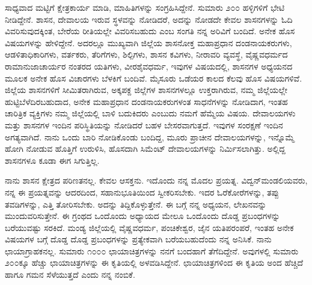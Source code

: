 ಸಾಧ್ಯವಾದ ಮಟ್ಟಿಗೆ ಕ್ಷೇತ್ರಕಾರ್ಯ ಮಾಡಿ, ಮಾಹಿತಿಗಳನ್ನು ಸಂಗ್ರಹಿಸಿದ್ದೇನೆ. ಸುಮಾರು ೨೦೦ ಹಳ್ಳಿಗಳಿಗೆ ಭೇಟಿ ನೀಡಿದ್ದೇನೆ. ಶಾಸನ, ದೇವಾಲಯ ಇರುವ ಸ್ಥಳವನ್ನು ನೋಡಿದರೆ, ಅದನ್ನು ನೋಡದೇ ಕೇವಲ ಶಾಸನಗಳನ್ನು ಓದಿ ವಿವರಿಸುವುದಕ್ಕಿಂತ, ಬೇರೆಯ ರೀತಿಯಲ್ಲೇ ವಿವರಿಸಬಹುದು ಎಂಬ ಸಂಗತಿ ನನ್ನ ಅರಿವಿಗೆ ಬಂದಿದೆ. ಅನೇಕ ಹೊಸ ವಿಷಯಗಳನ್ನು ಹೇಳಿದ್ದೇನೆ. ಅದರಲ್ಲೂ ಮುಖ್ಯವಾಗಿ ಜಿಲ್ಲೆಯ ಶಾಸನೋಕ್ತ ಮಹಾಪ್ರಧಾನ ದಂಡನಾಯಕರುಗಳು, ಆಡಳಿತಾಧಿಕಾರಿಗಳು, ವರ್ತಕರು, ತೆರಿಗೆಗಳು, ಶಿಲ್ಪಿಗಳು, ಶಾಸನ ಕವಿಗಳು, ನೀರಾವರಿ ವ್ಯವಸ್ಥೆ, ವೈಷ್ಣವಧರ್ಮದ ರಾಮಾನುಜಾಚಾರ್ಯರ ನಂತರದ ಯತಿಗಳು, ವೀರಶೈವಧರ್ಮ, ಇವುಗಳ ವಿಷಯದಲ್ಲಿ, ಶಾಸನಗಳ ಅಧ್ಯಯನದ ಮೂಲಕ ಅನೇಕ ಹೊಸ ವಿಚಾರಗಳು ಬೆಳಕಿಗೆ ಬಂದಿವೆ. ಮೈಸೂರು ಒಡೆಯರ ಕಾಲದ ಕೆಲವು ಹೊಸ ವಿಷಯಗಳಿವೆ. ಜಿಲ್ಲೆಯ ಶಾಸನಗಳಿಗೆ ಸೀಮಿತರಾಗಿರುವ, ಅಕ್ಕಪಕ್ದ ಜಿಲ್ಲೆಗಳ ಶಾಸನಗಳಲ್ಲೂ ಉಕ್ತರಾಗಿರುವ, ನಮ್ಮ ಜಿಲ್ಲೆಯಲ್ಲೇ ಹುಟ್ಟಿಬೆಳೆದಿರಬಹುದಾದ, ಅನೇಕ ಮಹಾಪ್ರಧಾನ ದಂಡನಾಯಕರುಗಳಂತ ಸಾಧನೆಗಳನ್ನು ನೋಡಿದಾಗ, ಇಂತಹ ಚಾರಿತ್ರಿಕ ವ್ಯಕ್ತಿಗಳು ನಮ್ಮ ಜಿಲ್ಲೆಯಲ್ಲಿ ಬಾಳಿ ಬದುಕಿದರು ಎಂಬುದು ನಮಗೆ ಹೆಮ್ಮೆಯ ವಿಷಯ. ದೇವಾಲಯಗಳು ಮತ್ತು ಶಾಸನಗಳ ಇಂದಿನ ಪರಿಸ್ಥಿತಿಯನ್ನು ನೋಡಿದರೆ ಬಹಳ ಬೇಸರವಾಗುತ್ತದೆ. ಇವುಗಳ ಸಂರಕ್ಷಣೆ ಇಂದಿನ ಅಗತ್ಯವಾಗಿದೆ. ನಾನು ಒಂದು ಬಾರಿ ನೋಡಿಕೊಂಡು ಬಂದಿದ್ದ, ಮೂರು ಪ್ರಾಚೀನ ದೇವಾಲಯಗಳನ್ನು, ಇನ್ನೊಮ್ಮೆ ಹೋಗಿ ನೋಡುವ ಹೊತ್ತಿಗೆ ಉರುಳಿಸಿ, ಹೊಸದಾಗಿ ಸಿಮೆಂಟ್​ ದೇವಾಲಯಗಳನ್ನು ನಿರ್ಮಿಸಲಾಗಿತ್ತು. ಅಲ್ಲಿದ್ದ ಶಾಸನಗಳೂ ಕೂಡಾ ಈಗ ಸಿಗುತ್ತಿಲ್ಲ. 

ನಾನು ಶಾಸನ ಕ್ಷೇತ್ರದ ಪರಿಣತನಲ್ಲ. ಕೇವಲ ಆಸಕ್ತನು. ಇದೊಂದು ನನ್ನ ಮೊದಲ ಪ್ರಯತ್ನ. ವಿದ್ವನ್​ ಮಂಡಲಿಯವರು, ನನ್ನ ಈ ಪ್ರಯತ್ನವನ್ನು ಆದರದಿಂದ, ಸಹಾನುಭೂತಿಯಿಂದ ಸ್ವೀಕರಿಸಬೇಕು. ಇದರ ಓರೆಕೋರೆಗಳನ್ನು, ತಪ್ಪು ತವಡಿಗಳನ್ನು, ಎತ್ತಿ ತೋರಿಸಬೇಕು. ಅದನ್ನು ತಿದ್ದಿಕೊಳ್ಳುತ್ತೇನೆ. ಈ ಬಗ್ಗೆ ನನ್ನ ಅಧ್ಯಯನ, ಲೇಖನವನ್ನು ಮುಂದುವರಿಸುತ್ತೇನೆ. ಈ ಗ್ರಂಥದ ಒಂದೊಂದು ಅಧ್ಯಾಯದ ಮೇಲೂ ಒಂದೊಂದು ದೊಡ್ಡ ಪ್ರಬಂಧಗಳನ್ನು ಬರೆಯುವಷ್ಟು ಸರಕಿದೆ. ಮಂಡ್ಯ ಜಿಲ್ಲೆಯಲ್ಲಿ ವೈಷ್ಣವಧರ್ಮ, ಪಂಚಿಕೇಶ್ವರ, ಜೈನ ಯತಿಪರಂಪರೆ, ಇಂತಹ ಅನೇಕ ವಿಷಯಗಳ ಬಗ್ಗೆ ದೊಡ್ಡ ದೊಡ್ಡ ಪ್ರಬಂಧಗಳನ್ನು ಪ್ರತ್ಯೇಕವಾಗಿ ಬರೆಯಬಹುದೆಂದು ನನ್ನ ಅನಿಸಿಕೆ. ನಾನು ಛಾಯಾಗ್ರಾಹಕನಲ್ಲ. ಸುಮಾರು ೧೦೦೦ ಛಾಯಾಚಿತ್ರಗಳನ್ನು ನನಗೆ ಬಂದಹಾಗೆ ತೆಗೆದಿದ್ದೇನೆ. ಅವುಗಳಲ್ಲಿ ಸುಮಾರು ೨೦೦ಕ್ಕೂ ಹೆಚ್ಚು ಛಾಯಾಚಿತ್ರಗಳನ್ನು ಈ ಕೃತಿಯಲ್ಲಿ ಅಳವಡಿಸಿದ್ದೇನೆ. ಛಾಯಾಚಿತ್ರಗಳಿಂದ ಈ ಕೃತಿಯ ಅಂದ ಹೆಚ್ಚಿದೆ ಹಾಗೂ ಗಮನ ಸೆಳೆಯುತ್ತದೆ ಎಂದು ನನ್ನ ನಂಬಿಕೆ. 

